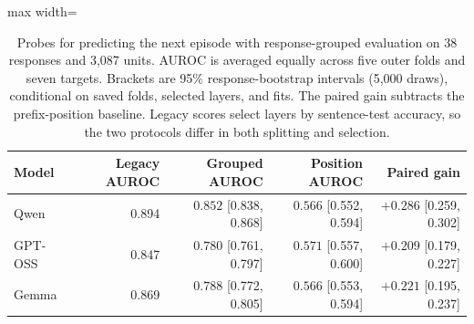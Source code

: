 \begin{table}[!ht]
\centering\small
\caption{Probes for predicting the next episode with response-grouped evaluation on 38 responses and 3,087 units. AUROC is averaged equally across five outer folds and seven targets. Brackets are 95\% response-bootstrap intervals (5,000 draws), conditional on saved folds, selected layers, and fits. The paired gain subtracts the prefix-position baseline. Legacy scores select layers by sentence-test accuracy, so the two protocols differ in both splitting and selection.}
\label{tab:probe-grouped-summary}
\begin{adjustbox}{max width=\linewidth}%
\begin{tabular}{lrrrr}
\toprule
Model & Legacy AUROC & Grouped AUROC & Position AUROC & Paired gain \\
\midrule
Qwen & 0.894 & $0.852$ [0.838, 0.868] & $0.566$ [0.552, 0.594] & $+0.286$ [0.259, 0.302] \\
GPT-OSS & 0.847 & $0.780$ [0.761, 0.797] & $0.571$ [0.557, 0.600] & $+0.209$ [0.179, 0.227] \\
Gemma & 0.869 & $0.788$ [0.772, 0.805] & $0.566$ [0.553, 0.594] & $+0.221$ [0.195, 0.237] \\
\bottomrule
\end{tabular}
\end{adjustbox}
\end{table}
